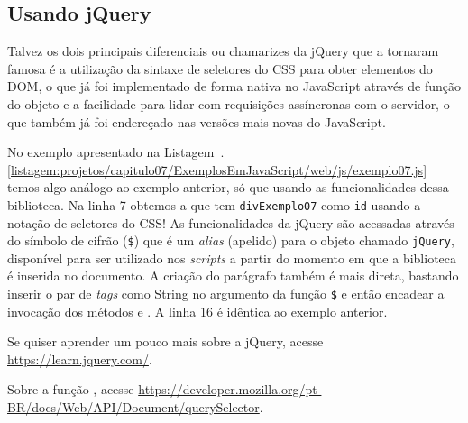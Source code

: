 

\subsection{Usando jQuery}

Talvez os dois principais diferenciais ou chamarizes da jQuery que a tornaram famosa é a utilização da sintaxe de seletores do CSS para obter elementos do DOM, o que já foi implementado de forma nativa no JavaScript através de função  do objeto  e a facilidade para lidar com requisições assíncronas com o servidor, o que também já foi endereçado nas versões mais novas do JavaScript.

No exemplo apresentado na Listagem~\thechapter.\ref{listagem:projetos/capitulo07/ExemplosEmJavaScript/web/js/exemplo07.js} temos algo análogo ao exemplo anterior, só que usando as funcionalidades dessa biblioteca. Na linha 7 obtemos a  que tem \texttt{divExemplo07} como \texttt{id} usando a notação de seletores do CSS! As funcionalidades da jQuery são acessadas através do símbolo de cifrão (\texttt{\$}) que é um \textit{alias} (apelido) para o objeto chamado \texttt{jQuery}, disponível para ser utilizado nos \textit{scripts} a partir do momento em que a biblioteca é inserida no documento. A criação do parágrafo também é mais direta, bastando inserir o par de \textit{tags} como String no argumento da função \texttt{\$} e então encadear a invocação dos métodos  e . A linha 16 é idêntica ao exemplo anterior.


\begin{saibaMais}
    Se quiser aprender um pouco mais sobre a jQuery, acesse \url{https://learn.jquery.com/}.
\end{saibaMais}

\begin{saibaMais}
    Sobre a função , acesse \url{https://developer.mozilla.org/pt-BR/docs/Web/API/Document/querySelector}.
\end{saibaMais}




